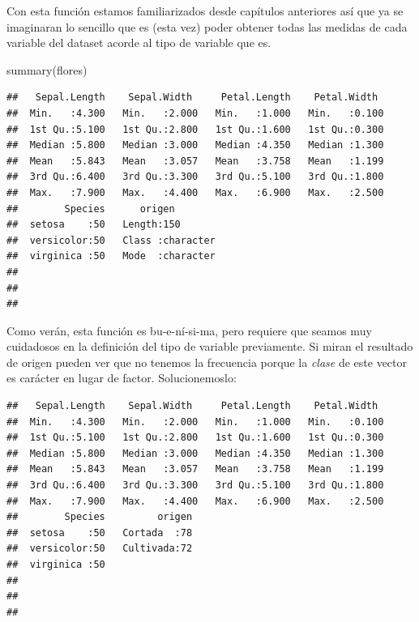\documentclass[
]{book}
\newenvironment{Shaded}{\begin{snugshade}}{\end{snugshade}}
\newcommand{\CommentTok}[1]{\textcolor[rgb]{0.56,0.35,0.01}{\textit{#1}}}
\newcommand{\FunctionTok}[1]{\textcolor[rgb]{0.00,0.00,0.00}{#1}}
\newcommand{\NormalTok}[1]{#1}
\newcommand{\OtherTok}[1]{\textcolor[rgb]{0.56,0.35,0.01}{#1}}
\newcommand{\SpecialCharTok}[1]{\textcolor[rgb]{0.00,0.00,0.00}{#1}}
\begin{document}
Con esta función estamos familiarizados desde capítulos anteriores así que ya se imaginaran lo sencillo que es (esta vez) poder obtener todas las medidas de cada variable del dataset acorde al tipo de variable que es.

\begin{Shaded}
\begin{Highlighting}[]
\FunctionTok{summary}\NormalTok{(flores)}
\end{Highlighting}
\end{Shaded}

\begin{verbatim}
##   Sepal.Length    Sepal.Width     Petal.Length    Petal.Width   
##  Min.   :4.300   Min.   :2.000   Min.   :1.000   Min.   :0.100  
##  1st Qu.:5.100   1st Qu.:2.800   1st Qu.:1.600   1st Qu.:0.300  
##  Median :5.800   Median :3.000   Median :4.350   Median :1.300  
##  Mean   :5.843   Mean   :3.057   Mean   :3.758   Mean   :1.199  
##  3rd Qu.:6.400   3rd Qu.:3.300   3rd Qu.:5.100   3rd Qu.:1.800  
##  Max.   :7.900   Max.   :4.400   Max.   :6.900   Max.   :2.500  
##        Species      origen         
##  setosa    :50   Length:150        
##  versicolor:50   Class :character  
##  virginica :50   Mode  :character  
##                                    
##                                    
## 
\end{verbatim}

Como verán, esta función es bu-e-ní-si-ma, pero requiere que seamos muy cuidadosos en la definición del tipo de variable previamente. Si miran el resultado de origen pueden ver que no tenemos la frecuencia porque la \emph{clase} de este vector es carácter en lugar de factor. Solucionemoslo:

\begin{Shaded}
\end{Shaded}

\begin{verbatim}
##   Sepal.Length    Sepal.Width     Petal.Length    Petal.Width   
##  Min.   :4.300   Min.   :2.000   Min.   :1.000   Min.   :0.100  
##  1st Qu.:5.100   1st Qu.:2.800   1st Qu.:1.600   1st Qu.:0.300  
##  Median :5.800   Median :3.000   Median :4.350   Median :1.300  
##  Mean   :5.843   Mean   :3.057   Mean   :3.758   Mean   :1.199  
##  3rd Qu.:6.400   3rd Qu.:3.300   3rd Qu.:5.100   3rd Qu.:1.800  
##  Max.   :7.900   Max.   :4.400   Max.   :6.900   Max.   :2.500  
##        Species         origen  
##  setosa    :50   Cortada  :78  
##  versicolor:50   Cultivada:72  
##  virginica :50                 
##                                
##                                
## 
\end{verbatim}
\end{document}
